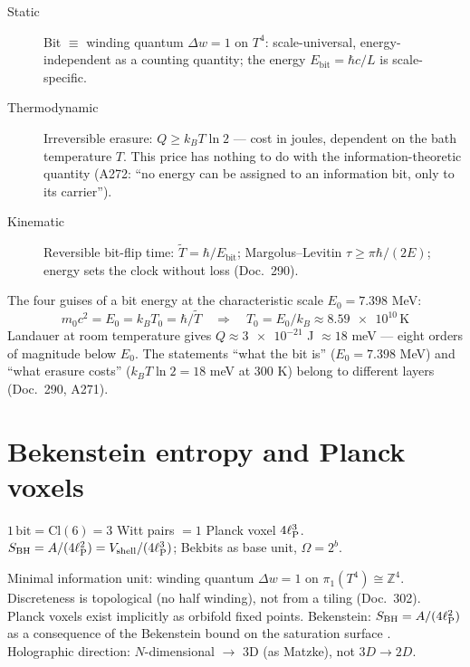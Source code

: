 \begin{description}
  \item[Static] Bit $\equiv$ winding quantum $\Delta w = 1$ on $T^4$:
    scale-universal, energy-independent as a counting quantity;
    the energy $E_{\mathrm{bit}} = \hbar c/L$ is scale-specific.
  \item[Thermodynamic] Irreversible erasure:
    $Q \geq k_B T\ln 2$ — cost in joules, dependent on the bath
    temperature $T$. This price has nothing to do with the
    information-theoretic quantity (A272: \enquote{no energy can be
    assigned to an information bit, only to its carrier}).
  \item[Kinematic] Reversible bit-flip time:
    $\tilde{T} = \hbar/E_{\mathrm{bit}}$;
    Margolus--Levitin $\tau \geq \pi\hbar/(2E)$;
    energy sets the clock without loss (Doc.\ 290).
\end{description}

The four guises of a bit energy at the characteristic scale $E_0 = 7.398$ MeV:
\begin{equation}
  m_0 c^2 = E_0 = k_B T_0 = \hbar/\tilde{T}
  \quad\Rightarrow\quad
  T_0 = E_0/k_B \approx \num{8.59e10}\,\mathrm{K}
\end{equation}
Landauer at room temperature gives $Q \approx \num{3e-21}$ J $\approx 18$ meV —
eight orders of magnitude below $E_0$.
The statements \enquote{what the bit is} ($E_0 = 7.398$ MeV)
and \enquote{what erasure costs} ($k_BT\ln 2 = 18$ meV at 300 K)
belong to different layers (Doc.\ 290, A271).

\section{Bekenstein entropy and Planck voxels}

\begin{tcolorbox}[matzbox, title={Matzke}]
  $1\,\mathrm{bit} = \mathrm{Cl}(6) = 3$ Witt pairs $= 1$ Planck voxel $4\ell_{\mathrm{P}}^3$. \B\\
  $S_{\mathrm{BH}} = A/(4\ell_{\mathrm{P}}^2) = V_{\mathrm{shell}}/(4\ell_{\mathrm{P}}^3)$;
  Bekbits as base unit, $\Omega = 2^b$.
\end{tcolorbox}

\begin{tcolorbox}[ffgftbox, title={FFGFT}]
  Minimal information unit: winding quantum $\Delta w = 1$ on
  $\pi_1(T^4) \cong \mathbb{Z}^4$. Discreteness is topological (no half
  winding), not from a tiling (Doc.\ 302).\\
  Planck voxels exist implicitly as orbifold fixed points.
  Bekenstein: $S_{\mathrm{BH}} = A/(4\ell_{\mathrm{P}}^2)$ as a consequence of the Bekenstein
  bound on the saturation surface \B.\\
  Holographic direction: $N$-dimensional $\to$ 3D (as Matzke), not $3D \to 2D$.
\end{tcolorbox}

